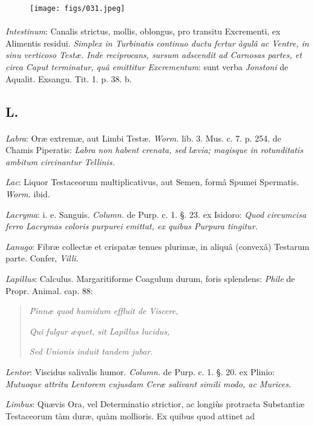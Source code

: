 \documentclass[a4paper, 11pt, oneside, polutonikogreek, german]{article}
\begin{document}
\begin{figure}[H]
\centering
\texttt{[image: figs/031.jpeg]}
\end{figure}
\paragraph{}
\emph{Intestinum}: Canalis strictus, mollis, oblongus, pro transitu Excrementi, ex Alimentis residui. \emph{Simplex in Turbinatis continuo ductu fertur àgulâ ac Ventre, in sinu verticoso Testæ. Inde reciprocans, sursum adscendit ad Carnosas partes, et circa Caput terminatur, quâ emittitur Excrementum}: sunt verba \emph{Jonstoni} de Aqualit. Exsangu. Tit. 1. p. 38. b.

\subsection{L.}
\paragraph{}
\emph{Labra}: Oræ extremæ, aut Limbi Testæ. \emph{Worm.} lib. 3. Mus. c. 7. p. 254. de Chamis Piperatis: \emph{Labra non habent crenata, sed lævia; magisque in rotunditatis ambitum circinantur Tellinis.}

\emph{Lac}: Liquor Testaceorum multiplicativus, aut Semen, formâ Spumei Spermatis. \emph{Worm.} ibid.

\emph{Lacryma}: i. e. Sanguis. \emph{Column.} de Purp. c. 1. §. 23. ex Isidoro: \emph{Quod circumcisa ferro Lacrymas coloris purpurei emittat, ex quibus Purpura tingitur.}

\emph{Lanugo}: Fibræ collectæ et crispatæ tenues plurimæ, in aliquâ (convexâ) Testarum parte. Confer, \emph{Villi}.

\emph{Lapillus}: Calculus. Margaritiforme Coagulum durum, foris splendens: \emph{Phile} de Propr. Animal. cap. 88:
\begin{quotation}
\emph{Pinnæ quod humidum effluit de Viscere,}

\emph{Qui fulgur æquet, sit Lapillus lucidus,}

\emph{Sed Unionis induit tandem jubar.}
\end{quotation}
\emph{Lentor}: Viscidus salivalis humor. \emph{Column.} de Purp. c. 1. §. 20. ex Plinio: \emph{Mutuoque attritu Lentorem cujusdam Ceræ salivant simili modo, ac Murices.}

\emph{Limbus}: Quævis Ora, vel Determinatio strictior, ac longiùs protracta Substantiæ Testaceorum tàm duræ, quàm mollioris. Ex quibus quod attinet ad
\end{document}
